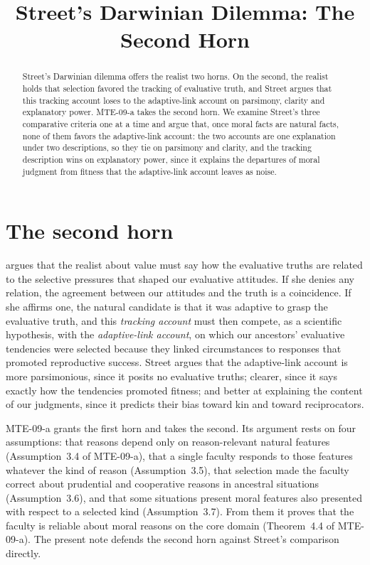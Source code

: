 \documentclass{situationist-preprint}
\title{Street's Darwinian Dilemma: The Second Horn}
\begin{document}
\maketitle

\begin{abstract}
Street's Darwinian dilemma offers the realist two horns. On the second, the realist holds that selection favored the tracking of evaluative truth, and Street argues that this tracking account loses to the adaptive-link account on parsimony, clarity and explanatory power. MTE-09-a takes the second horn. We examine Street's three comparative criteria one at a time and argue that, once moral facts are natural facts, none of them favors the adaptive-link account: the two accounts are one explanation under two descriptions, so they tie on parsimony and clarity, and the tracking description wins on explanatory power, since it explains the departures of moral judgment from fitness that the adaptive-link account leaves as noise.
\end{abstract}

\section{The second horn}

\citet{Street2006} argues that the realist about value must say how the evaluative truths are related to the selective pressures that shaped our evaluative attitudes. If she denies any relation, the agreement between our attitudes and the truth is a coincidence. If she affirms one, the natural candidate is that it was adaptive to grasp the evaluative truth, and this \emph{tracking account} must then compete, as a scientific hypothesis, with the \emph{adaptive-link account}, on which our ancestors' evaluative tendencies were selected because they linked circumstances to responses that promoted reproductive success. Street argues that the adaptive-link account is more parsimonious, since it posits no evaluative truths; clearer, since it says exactly how the tendencies promoted fitness; and better at explaining the content of our judgments, since it predicts their bias toward kin and toward reciprocators.

MTE-09-a grants the first horn and takes the second. Its argument rests on four assumptions: that reasons depend only on reason-relevant natural features (Assumption~3.4 of MTE-09-a), that a single faculty responds to those features whatever the kind of reason (Assumption~3.5), that selection made the faculty correct about prudential and cooperative reasons in ancestral situations (Assumption~3.6), and that some situations present moral features also presented with respect to a selected kind (Assumption~3.7). From them it proves that the faculty is reliable about moral reasons on the core domain (Theorem~4.4 of MTE-09-a). The present note defends the second horn against Street's comparison directly.
\end{document}
